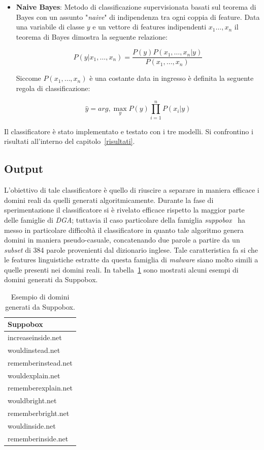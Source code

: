 \begin{itemize}
\item \textbf{Naive Bayes}: Metodo di classificazione supervisionata basati sul teorema di Bayes con un assunto "\textit{naive}" di indipendenza tra ogni coppia di feature. Data una variabile di classe $y$ e un vettore di features indipendenti $x_1 \dots, x_n$ il teorema di Bayes dimostra la seguente relazione: 

\[P\left(y|x_1,\dots,x_n\right) = \frac{P(y)P(x_1,\dots,x_n|y)}{P(x_1,\dots,x_n)}\]
 
Siccome $P(x_1,\dots,x_n)$ è una costante data in ingresso è definita la seguente regola di classificazione:
 
 \[\hat{y} = arg,\max_{y}P(y)\displaystyle\prod_{i=1}^n P(x_i|y)\]
 
\end{itemize}

Il classificatore è stato implementato e testato con i tre modelli. Si confrontino i risultati all'interno del capitolo~\ref{risultati}.

\subsection{Output}
\label{randomforestoutput}
L'obiettivo di tale classificatore è quello di riuscire a separare in maniera efficace i domini reali da quelli generati algoritmicamente. Durante la fase di sperimentazione il classificatore si è rivelato efficace rispetto la maggior parte delle famiglie di \textit{DGA}; tuttavia il caso particolare della famiglia \textit{suppobox}~\cite{geffner2013end} ha messo in particolare difficoltà il classificatore in quanto tale algoritmo genera domini in maniera pseudo-casuale, concatenando due parole a partire da un \textit{subset} di 384 parole provenienti dal dizionario inglese. Tale caratteristica fa si che le features linguistiche estratte da questa famiglia di \textit{malware} siano molto simili a quelle presenti nei domini reali. In tabella~\ref{tab:suppobox} sono mostrati alcuni esempi di domini generati da Suppobox.


\begin{table}[!htbp]
    \centering
    \begin{tabular}{|l|}
        \hline
        Suppobox
        \\
        \hline
        \hline
       	increaseinside.net \\
		wouldinstead.net \\
		rememberinstead.net \\
		wouldexplain.net \\
		rememberexplain.net \\
		wouldbright.net \\
		rememberbright.net \\
		wouldinside.net \\
		rememberinside.net \\
        \hline
    \end{tabular}
    \caption{Esempio di domini generati da Suppobox. \label{tab:suppobox}}
\end{table}


